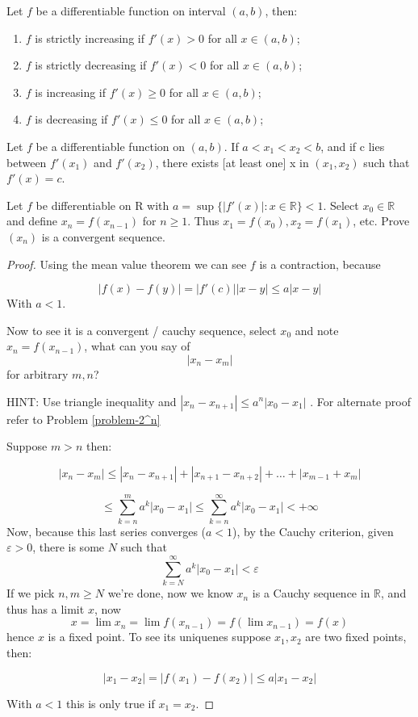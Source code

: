 \documentclass{notes}
\begin{document}
\begin{corollary}{}
Let $f$ be a differentiable function on interval $(a,b)$, then:
\begin{enumerate}[(i.)]
\item $f$ is strictly increasing if $f '(x) > 0$ for all $x \in(a, b)$;
\item $f$ is strictly decreasing if $f '(x) < 0$ for all $x \in(a, b)$;
\item $f$ is increasing if $f '(x) \geq 0$ for all $x \in(a, b)$;
\item $f$ is decreasing if $f '(x) \leq 0$ for all $x \in(a, b)$;
\end{enumerate}
\end{corollary}

\begin{theorem}{}
	Let $f$ be a differentiable function on $(a, b)$. If $a < x_1 < x_2 < b$, and
	if c lies between $f'(x_1)$ and $f '(x_2)$, there exists [at least one] x in
	$(x_1, x_2)$ such that $f '(x) = c$.
\end{theorem}
\begin{problem}
Let $f$ be differentiable on R with $a = \sup\{|f'(x)| : x \in \mathbb{R}\} < 1$. Select $x_0 \in \mathbb{R}$ and define $x_n =f(x_{n - 1})$ for $n \geq 1$. Thus $x_1 = f (x_0 ), x_2 = f (x_1 )$, etc. Prove $(x_n )$ is a convergent sequence.
\end{problem}
\begin{proof}
	Using the mean value theorem we can see $f$ is a contraction, because
	
	$$|f(x) - f(y)| = |f'(c)||x-y| \leq a|x-y|$$
	With $a < 1$.
	
	
	Now to see it is a convergent / cauchy sequence, select $x_0$ and note $x_n = f(x_{n-1})$, what can you say of $$|x_n - x_m|$$ for arbitrary $m, n$?
	
	HINT: Use triangle inequality and $|x_n - x_{n+1}| \leq a^n|x_0 - x_1| $ . For alternate proof refer to Problem \ref{problem-2^n}
	
 Suppose $m > n$ then:
	
	$$|x_n - x_m| \leq |x_n - x_{n+1}| + |x_{n+1} - x_{n+2}| + \dots + |x_{m-1} + x_{m}|$$
	
	$$\leq \sum_{k = n}^m a^k |x_0 - x_1| \leq \sum_{k = n}^{\infty} a^k |x_0 - x_1| < +\infty $$
	Now, because this last series converges ($a < 1$), by the Cauchy criterion, given $\varepsilon >0$, there is some $N$ such that $$\sum_{k = N}^{\infty} a^k |x_0 - x_1| < \varepsilon $$
	If we pick $n,m \geq N$ we're done, now we know $x_n$ is a Cauchy sequence in $\mathbb{R}$, and thus has a limit $x$, now $$x = \lim x_n = \lim f(x_{n-1}) = f(\lim x_{n-1}) = f(x)$$ hence $x$ is a fixed point. To see its uniquenes suppose $x_1, x_2$ are two fixed points, then:
	
	$$|x_1 - x_2| = |f(x_1) - f(x_2)| \leq a|x_1 - x_2|   $$
	
	With $a < 1$ this is only true if $x_1 = x_2$.
\end{proof}
\end{document}
